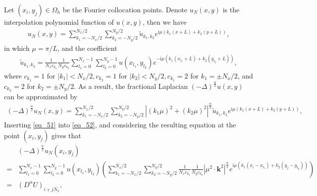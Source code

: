 \documentclass[preprint,compress,3p,10pt,fleqn]{elsarticle}
\numberwithin{equation}{section}
\begin{document}
Let $\left(x_{i}, y_{j}\right) \in \Omega_{h}$ be the Fourier collocation points. Denote $u_{N}(x, y)$ is the
interpolation polynomial function of $u(x, y)$, then we have
\begin{align}\label{eq_50}
u_{N}(x, y)=\sum_{k_{1}=-N_{x} / 2}^{N_{x} / 2} \sum_{k_{2}=-N_{y} / 2}^{N_{y} / 2} \tilde{u}_{k_{1}, k_{2}} e^{\mathrm{i}\mu\left( k_{1} (x+L)+k_{2}(y+L)\right)},
\end{align}
in which $\mu={\pi}/{L}$, and the coefficient
\begin{align}\label{eq_51}
\tilde{u}_{k_{1}, k_{2}}=\frac{1}{N_{x} c_{k_{1}}} \frac{1}{N_{y} c_{k_{2}}} \sum_{l_1=0}^{N_{x}-1} \sum_{l_2=0}^{N_{y}-1} u(x_{l_1}, y_{l_2}) e^{-\mathrm{i}\mu\left( k_{1}(x_{l_1}+L)+k_{2}(y_{l_2}+L)\right)},
\end{align}
where $c_{k_{1}}=1$ for $\left|k_{1}\right|<N_{x} / 2, c_{k_{2}}=1$ for $\left|k_{2}\right|<N_{y} / 2, c_{k_{1}}=2$ for $k_{1}=\pm N_{x} / 2$, and $c_{k_{2}}=2$ for $k_{2}=\pm N_{y} / 2$.
As a result, the fractional Laplacian $(-\Delta)^{\frac{\alpha}{2}} u(x, y)$ can be approximated by
\begin{align}\label{eq_52}
(-\Delta)^{\frac{\alpha}{2}} u_{N}\left(x, y\right)=\sum\limits_{k_{1}=-N_{x} / 2}^{N_{x} / 2} \sum\limits_{k_{2}=-N_{y} / 2}^{N_{y} / 2}\left|\left(k_{1} \mu\right)^{2}+\left(k_{2} \mu\right)^{2}\right|^{\frac{\alpha}{2}} \tilde{u}_{k_{1}, k_{2}} e^{\mathrm{i}\mu\left( k_{1} (x+L)+k_{2}(y+L)\right)},
\end{align}
Inserting \eqref{eq_51} into \eqref{eq_52}, and considering the resulting equation at the point $(x_i,y_j)$ gives that
\begin{align}
&(-\Delta)^{\frac{\alpha}{2}} u_{N}\left(x_{i}, y_{j}\right)\nonumber\\
=&\sum\limits_{l_{1}=0}^{N_{x}-1} \sum\limits_{l_{2}=0}^{N_{y}-1}u(x_{l_{1}}, y_{l_{2}})\left(\sum\limits_{k_{1}=-N_{x} / 2}^{N_{x} / 2} \sum\limits_{k_{2}=-N_{y} / 2}^{N_{y} / 2} \frac{1}{N_{x} c_{k_{1}}} \frac{1}{N_{y} c_{k_{2}}}\left|\mu^{2} \cdot \mathbf{k}^{2}\right|^{\frac{\alpha}{2}} e^{\mathrm{i} \mu\left(k_{1}\left(x_{i}-x_{l_{1}}\right)+k_{2}\left(y_{j}-y_{l_{2}}\right)\right)}\right)\nonumber\\
=&\left(D^{\alpha}U\right)_{i+j N_{x}},\label{eq_53}
\end{align}
\end{document}
